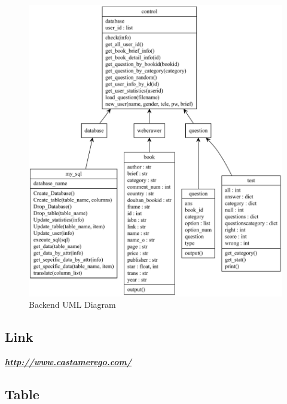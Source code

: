 \documentclass[twoside,11pt]{article}
\begin{document}
\begin{figure}[H]
    \includegraphics[width=1\columnwidth]{figures/backenduml.pdf}
    \caption{Backend UML Diagram}
    \label{fig:backenduml}
\end{figure}

\subsection{Link}

\href{http://www.castamerego.com/}{\textbf{\emph{http://www.castamerego.com/}}}

\subsection{Table}
\end{document}
